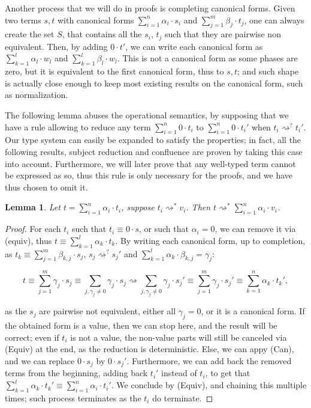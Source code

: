 \documentclass[10pt,a4paper]{article}
\newcommand{\reduces}{\rightsquigarrow}
\newcommand{\sreduces}{\reduces^*}
\newcommand{\zoreduces}{\ensuremath{\reduces^?}}%
\newcommand{\ie}{\text{i.e., }}
\newtheorem{lemma}[theorem]{Lemma}
\begin{document}
Another process that we will do in proofs is completing canonical forms.
Given two terms $s, t$ with canonical forms $\sum_{i=1}^n \alpha_i \cdot s_i$
and $\sum_{j=1}^m \beta_j \cdot t_j$, one can always create the set $S$,
that contains all the $s_i$, $t_j$ such that they are pairwise non equivalent.
Then, by adding $0 \cdot t'$, we can write each canonical form as
$\sum_{k=1}^l \alpha_l \cdot w_l$ and $\sum_{k=1}^l \beta_l \cdot w_l$.
This is not a canonical form as some phases are zero, but it is equivalent to
the first canonical form, thus to $s, t$; and such shape is actually
close enough
to keep most existing results on the canonical form, such as normalization.

The following lemma abuses the operational semantics, by supposing that we
have a rule allowing to reduce any term $\sum_{i=1}^n 0 \cdot t_i$ to
$\sum_{i=1}^n 0 \cdot t_i'$ when $t_i \zoreduces t_i'$. Our type system
can easily be expanded to satisfy the properties; in fact, all the following
results, \ie{} subject reduction and confluence are proven by taking this case
into account. Furthermore, we will later prove that any well-typed term
cannot be expressed as so, thus this rule is only necessary for the proofs,
and we have thus chosen to omit it.

\begin{lemma}
  \label{lem:reduces-sum}
  Let $t = \sum_{i=1}^n \alpha_i \cdot t_i$, suppose $t_i \sreduces v_i$.
  Then $t \sreduces \sum_{i=1}^n \alpha_i \cdot v_i$.
\end{lemma}

\begin{proof}
  For each $t_i$ such that $t_i \equiv 0 \cdot s$,
  or such that $\alpha_i = 0$, we can remove it via (equiv),
  thus $t \equiv \sum_{k=1}^l \alpha_k \cdot t_k$.
  By writing each canonical form, up to completion, as
  $t_k \equiv \sum_{j=1}^m \beta_{k,j} \cdot s_j$,
  $s_j \zoreduces s_j'$
  and $\sum_{k=1}^l \alpha_k \cdot \beta_{k,j} = \gamma_j$:

  \[
    t \equiv \sum_{j=1}^m \gamma_j \cdot s_j \equiv \sum_{j, \gamma_j
    \neq 0} \gamma_j \cdot s_j
    \reduces \sum_{j, \gamma_j \neq 0} \gamma_j \cdot s_j' \equiv
    \sum_{j=1}^m \gamma_j \cdot s_j' \equiv \sum_{k=1}^n \alpha_k \cdot t_k',
  \]

  as the $s_j$ are pairwise not equivalent, either all $\gamma_j = 0$, or
  it is a canonical form. If the obtained form is a value,
  then we can stop here, and the result will be correct; even if $t_i$ is not
  a value, the non-value parts will still be canceled via (Equiv) at the
  end, as the reduction is deterministic.
  Else, we can appy (Can), and we can replace $0 \cdot s_j$ by $0 \cdot s_j'$.
  Furthermore, we can add back the removed terms from the beginning, adding
  back $t_i'$ instead of $t_i$, to get that
  $\sum_{k=1}^l \alpha_k \cdot t_k' \equiv \sum_{i=1}^n \alpha_i \cdot t_i'$.
  We conclude by (Equiv), and chaining this multiple times;
  such process terminates as the $t_i$ do terminate. \qedhere
\end{proof}
\end{document}
